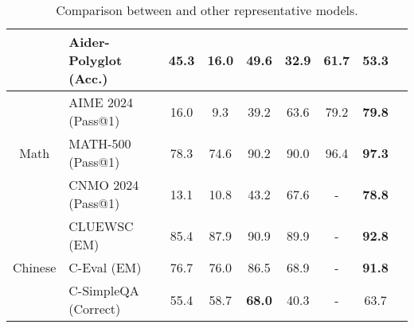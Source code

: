 \begin{table}[h]
\begin{tabular}{@{}c l | c  c  c | c c |c c@{}}
    & Aider-Polyglot {\tiny (Acc.)} & 45.3&16.0& 49.6 & 32.9 & \textbf{61.7}&53.3\\
    \midrule
    \multirow{3}{*}{Math} & AIME 2024 {\tiny (Pass@1)}  & 16.0 & 9.3 & 39.2 & 63.6 & 79.2 & \textbf{79.8} \\
    & MATH-500 {\tiny (Pass@1)} &78.3 & 74.6&90.2 & 90.0 & 96.4 & \textbf{97.3} \\
    & CNMO 2024 {\tiny (Pass@1)} & 13.1 & 10.8 &43.2 & 67.6 & - & \textbf{78.8} \\
    \midrule
    \multirow{3}{*}{Chinese} & CLUEWSC {\tiny (EM)}&  85.4 & 87.9 & 90.9 & 89.9 & - &\textbf{92.8}\\
    & C-Eval {\tiny (EM)} & 76.7 & 76.0 & 86.5 & 68.9 & - & \textbf{91.8}\\
     & C-SimpleQA {\tiny (Correct)}  & 55.4 & 58.7 & \textbf{68.0} & 40.3 & -& 63.7 \\
    \bottomrule
    \end{tabular}
    \caption{ Comparison between \dsri{} and other representative models. 
    }
    \label{tab:main}
\end{table}
